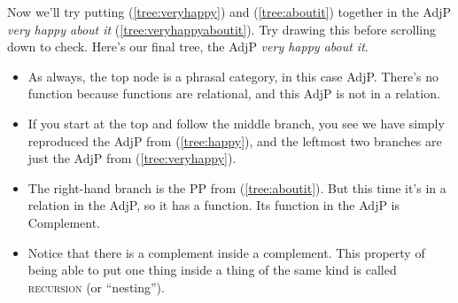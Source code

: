 \ea {}\label{tree:aboutit}
\z
{}

Now we'll try putting (\ref{tree:veryhappy}) and (\ref{tree:aboutit}) together in the AdjP \textit{very happy about it} (\ref{tree:veryhappyaboutit}). Try drawing this before scrolling down to check. Here's our final tree, the AdjP \textit{very happy about it}.
\begin{itemize}[noitemsep]
    \item As always, the top node is a phrasal category, in this case AdjP. There's no function because functions are relational, and this AdjP is not in a relation.
    \item If you start at the top and follow the middle branch, you see we have simply reproduced the AdjP from (\ref{tree:happy}), and the leftmost two branches are just the AdjP from (\ref{tree:veryhappy}).
    \item The right-hand branch is the PP from (\ref{tree:aboutit}). But this time it's in a relation in the AdjP, so it has a function. Its function in the AdjP is Complement.
    \item Notice that there is a complement inside a complement. This property of being able to put one thing inside a thing of the same kind is called \textsc{recursion} (or ``nesting''). 
\end{itemize}

